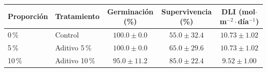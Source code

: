 \begin{tabular}{llccc}
\hline\hline
\textbf{Proporci\'on} & \textbf{Tratamiento} & \textbf{Germinaci\'on (\%)} & \textbf{Supervivencia (\%)} & \textbf{DLI (mol$\cdot$m$^{-2}\cdot$d\'ia$^{-1}$)} \\
\hline
0\,\% & Control & $100.0 \pm 0.0$ & $55.0 \pm 32.4$ & $10.73 \pm 1.02$ \\
5\,\% & Aditivo 5\,\% & $100.0 \pm 0.0$ & $65.0 \pm 29.6$ & $10.73 \pm 1.02$ \\
10\,\% & Aditivo 10\,\% & $95.0 \pm 11.2$ & $85.0 \pm 22.4$ & $9.52 \pm 1.00$ \\
\hline
\end{tabular}
